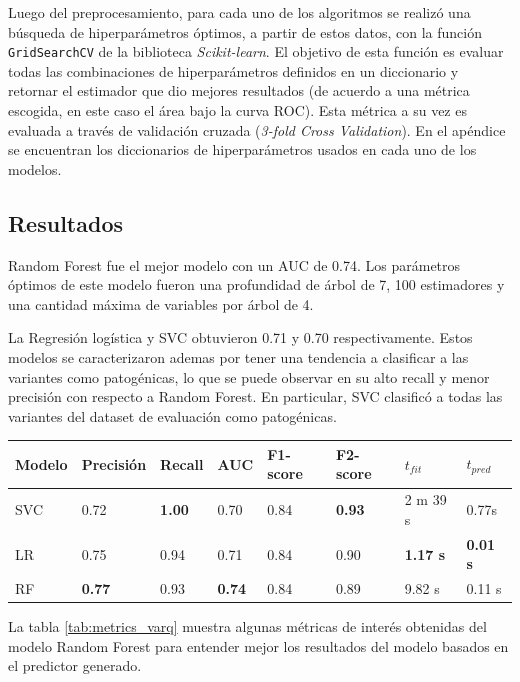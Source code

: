 Luego del preprocesamiento, para cada uno de los algoritmos se realizó una búsqueda de hiperparámetros óptimos, a partir de estos datos, con la función \texttt{GridSearchCV} de la biblioteca \textit{Scikit-learn}. El objetivo de esta función es evaluar todas las combinaciones de hiperparámetros definidos en un diccionario y retornar el estimador que dio mejores resultados (de acuerdo a una métrica escogida, en este caso el área bajo la curva ROC). Esta métrica a su vez es evaluada a través de validación cruzada (\textit{3-fold Cross Validation}). En el apéndice se encuentran los diccionarios de hiperparámetros usados en cada uno de los modelos.

\subsection{Resultados}

Random Forest fue el mejor modelo con un AUC de 0.74. Los parámetros óptimos de este modelo fueron una profundidad de árbol de 7, 100 estimadores y una cantidad máxima de variables por árbol de 4.

La Regresión logística y SVC obtuvieron 0.71 y 0.70 respectivamente. Estos modelos se caracterizaron ademas por tener una tendencia a clasificar a las variantes como patogénicas, lo que se puede observar en su alto recall y menor precisión con respecto a Random Forest. En particular, SVC clasificó a todas las variantes del dataset de evaluación como patogénicas.

\begin{table}[H]
\centering
\begin{tabular}{|l|l|l|l|l|l|l|l|}
\hline
Modelo & Precisión & Recall & AUC & F1-score & F2-score & $t_{fit}$ & $t_{pred}$ \\ \hline
SVC    & 0.72 & \textbf{1.00} & 0.70 & 0.84 & \textbf{0.93} & 2 m 39 s & 0.77s \\ \hline
LR     & 0.75 & 0.94 & 0.71 & 0.84 & 0.90 & \textbf{1.17 s} & \textbf{0.01 s} \\ \hline
RF     & \textbf{0.77} & 0.93 & \textbf{0.74} & 0.84 & 0.89 & 9.82 s & 0.11 s \\ \hline
\end{tabular}
\label{tab:metrics_model}
\end{table}




La tabla \ref{tab:metrics_varq} muestra algunas métricas de interés obtenidas del modelo Random Forest para entender mejor los resultados del modelo basados en el predictor generado.



